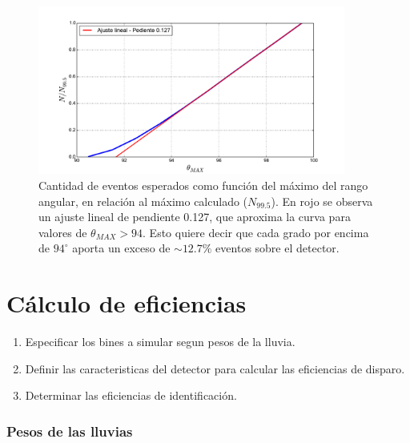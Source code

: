 	\begin{figure}[h!]
		\begin{center}
			\includegraphics[width=0.9\textwidth]{fig/resultadosRadio/eventGain_thetas}
			\caption{\label{fig:gainThetas} Cantidad de eventos esperados como funci\'on del m\'aximo del rango angular, en relaci\'on al m\'aximo calculado ($N_{99.5}$).
			En rojo se observa un ajuste lineal de pendiente 0.127, que aproxima la curva para valores de $\theta_{MAX}>94$.
			Esto quiere decir que cada grado por encima de $94^\circ$ aporta un exceso de $\sim12.7\%$ eventos sobre el detector.
			}
			
		\end{center}
	\end{figure}
	
	
\section{C\'alculo de eficiencias}
	
	\begin{enumerate}
	 \item Especificar los bines a simular segun pesos de la lluvia.
	 \item Definir las caracteristicas del detector para calcular las eficiencias de disparo.
	 \item Determinar las eficiencias de identificaci\'on.
	\end{enumerate}

	
	\subsubsection{Pesos de las lluvias}

